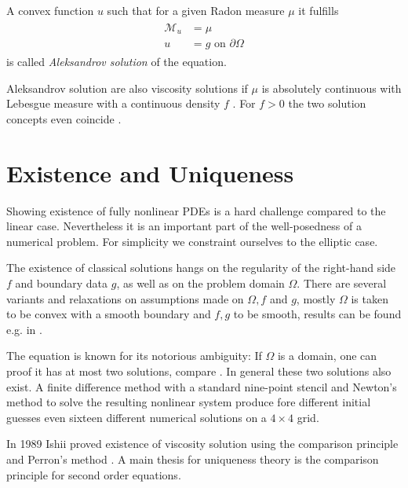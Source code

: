 \begin{definition}\label{def:aleksandrov solution}
A convex function $u$ such that for a given Radon measure $\mu$ it fulfills
\begin{align}
\begin{split}
\mathcal M_u&= \mu \\ 
u &= g  \text{ on } \partial \Omega
\end{split}
\end{align}
is called \emph{Aleksandrov solution} of the \MA equation.
\end{definition}

Aleksandrov solution are also viscosity solutions if $\mu$ is absolutely continuous with Lebesgue measure with a continuous density $f$ \cite[proposition 1.3.4.]{Gutierrez2001} . For $f > 0$ the two solution concepts even coincide \cite[proposition 1.7.1]{Gutierrez2001}. 

\section{Existence and Uniqueness}
Showing existence of fully nonlinear PDEs is a hard challenge compared to the linear case. Nevertheless it is an important part of the well-posedness of a numerical problem. 
For simplicity we constraint ourselves to the elliptic case. 

The existence of classical solutions hangs on the regularity of the right-hand side $f$ and boundary data $g$, as well as on the problem domain $\Omega$. There are several variants and relaxations on assumptions made on $\Omega,f$ and $g$, mostly $\Omega$ is taken to be convex with a smooth boundary and $f,g$ to be smooth, results can be found e.g. in \cite{Gutierrez2001, GT1983, Urbas1998}.

The \MA equation is known for its notorious ambiguity: If $\Omega$ is a domain, one can proof it has at most two solutions, compare \cite[Kap.IV, \S 5,3]{CH1968}. In general these two solutions also exist.
A finite difference method with a standard nine-point stencil and Newton's method to solve the resulting nonlinear system produce fore different initial guesses even sixteen different numerical solutions on a $4 \times 4$ grid\cite{FGN2013}. 

In 1989 Ishii proved existence of viscosity solution using the comparison principle and Perron's method \cite{Ishii1989}. 
A main thesis for uniqueness theory is the comparison principle for second order equations.

